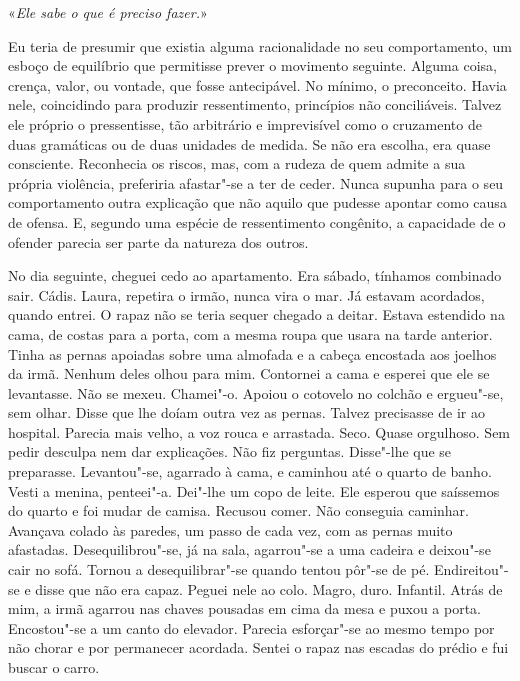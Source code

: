 «\emph{Ele sabe o que é preciso fazer.}»

Eu teria de presumir que existia alguma racionalidade no seu
comportamento, um esboço de equilíbrio que permitisse prever o movimento
seguinte. Alguma coisa, crença, valor, ou vontade, que fosse
antecipável. No mínimo, o preconceito. Havia nele, coincidindo para
produzir ressentimento, princípios não conciliáveis. Talvez ele próprio
o pressentisse, tão arbitrário e imprevisível como o cruzamento de duas
gramáticas ou de duas unidades de medida. Se não era escolha, era quase
consciente. Reconhecia os riscos, mas, com a rudeza de quem admite a sua
própria violência, preferiria afastar"-se a ter de ceder. Nunca supunha
para o seu comportamento outra explicação que não aquilo que pudesse
apontar como causa de ofensa. E, segundo uma espécie de ressentimento
congênito, a capacidade de o ofender parecia ser parte da natureza dos
outros.

No dia seguinte, cheguei cedo ao apartamento. Era sábado, tínhamos
combinado sair. Cádis. Laura, repetira o irmão, nunca vira o mar. Já
estavam acordados, quando entrei. O rapaz não se teria sequer chegado a
deitar. Estava estendido na cama, de costas para a porta, com a mesma
roupa que usara na tarde anterior. Tinha as pernas apoiadas sobre uma
almofada e a cabeça encostada aos joelhos da irmã. Nenhum deles olhou
para mim. Contornei a cama e esperei que ele se levantasse. Não se
mexeu. Chamei"-o. Apoiou o cotovelo no colchão e ergueu"-se, sem olhar.
Disse que lhe doíam outra vez as pernas. Talvez precisasse de ir ao
hospital. Parecia mais velho, a voz rouca e arrastada. Seco. Quase
orgulhoso. Sem pedir desculpa nem dar explicações. Não fiz perguntas.
Disse"-lhe que se preparasse. Levantou"-se, agarrado à cama, e caminhou
até o quarto de banho. Vesti a menina, penteei"-a. Dei"-lhe um copo de
leite. Ele esperou que saíssemos do quarto e foi mudar de camisa.
Recusou comer. Não conseguia caminhar. Avançava colado às paredes, um
passo de cada vez, com as pernas muito afastadas. Desequilibrou"-se, já
na sala, agarrou"-se a uma cadeira e deixou"-se cair no sofá. Tornou a
desequilibrar"-se quando tentou pôr"-se de pé. Endireitou"-se e disse
que não era capaz. Peguei nele ao colo. Magro, duro. Infantil. Atrás de
mim, a irmã agarrou nas chaves pousadas em cima da mesa e puxou a porta.
Encostou"-se a um canto do elevador. Parecia esforçar"-se ao mesmo tempo
por não chorar e por permanecer acordada. Sentei o rapaz nas escadas do
prédio e fui buscar o carro.

